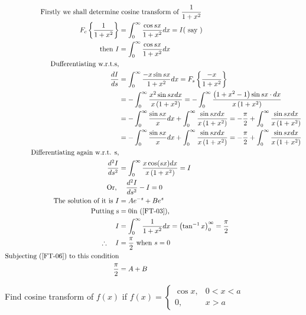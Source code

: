 \begin{answer}
	\begin{align}
	\text { Firstly we shall determine}&\text{ cosine transform of } \frac{1}{1+x^{2}}\notag\\
	F_{c}\left\{\frac{1}{1+x^{2}}\right\}&=\int_{0}^{\infty} \frac{\cos s x}{1+x^{2}} d x=I(\text { say })\notag\\
	\text{then }I&=\int_{0}^{\infty} \frac{\cos s x}{1+x^{2}} d x\label{FT-03}\\
	\text{Dufferentiating w.r.t.s,}\notag\\
	\frac{d I}{d s} &=\int_{0}^{\infty} \frac{-x \sin s x}{1+x^{2}} d x=F_{s}\left\{\frac{-x}{1+x^{2}}\right\}\label{FT-04} \\
	&=-\int_{0}^{\infty} \frac{x^{2} \sin s x d x}{x\left(1+x^{2}\right)}=-\int_{0}^{\infty} \frac{\left(1+x^{2}-1\right) \sin s x \cdot d x}{x\left(1+x^{2}\right)}\notag\\
	&=-\int_{0}^{\infty} \frac{\sin s x}{x} d x+\int_{0}^{\infty} \frac{\sin s x d x}{x\left(1+x^{2}\right)}=-\frac{\pi}{2}+\int_{0}^{\infty} \frac{\sin s x d x}{x\left(1+x^{2}\right)}\notag\\
	&=-\int_{0}^{\infty} \frac{\sin s x}{x} d x+\int_{0}^{\infty} \frac{\sin s x d x}{x\left(1+x^{2}\right)}=-\frac{\pi}{2}+\int_{0}^{\infty} \frac{\sin s x d x}{x\left(1+x^{2}\right)}\label{FT-05}\\
	\text{Differentiating again w.r.t. s,}\notag\\
	\frac{d^{2} I}{d s^{2}}&=\int_{0}^{\infty} \frac{x \cos (s x) d x}{x\left(1+x^{2}\right)}=I\notag\\
	\text { Or, } &\quad \frac{d^{2} I}{d s^{2}}-I=0\notag\\
	\text{The solution of it is }I&=A e^{-s}+B e^{s}\label{FT-06}\\
	\text{ Putting }\mathrm{s}&=0 \text{in (\ref{FT-03}),}\notag\\
	I &=\int_{0}^{\infty} \frac{1}{1+x^{2}} d x=\left(\tan ^{-1} x\right)_{0}^{\infty}=\frac{\pi}{2} \notag\\
	\therefore \quad I &=\frac{\pi}{2} \text { when } s=0\notag\\
	\text{Subjecting (\ref{FT-06}) to this condition}\notag\\
	\frac{\pi}{2}&=A+B\label{FT-07}
	\end{align}
\end{answer}
\begin{exercise}
	Find cosine transform of $f(x)$ if $f(x)= \begin{cases}\cos x, & 0<x<a \\ 0, & x>a\end{cases}$
\end{exercise}
